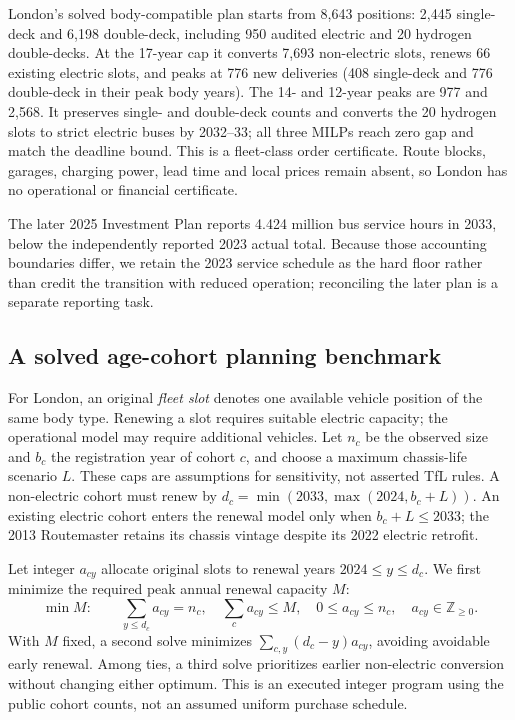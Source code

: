 \documentclass[12pt,letterpaper]{article}
\begin{document}


London's solved body-compatible plan starts from 8,643 positions: 2,445 single-deck and 6,198 double-deck, including 950 audited electric and 20 hydrogen double-decks. At the 17-year cap it converts 7,693 non-electric slots, renews 66 existing electric slots, and peaks at 776 new deliveries (408 single-deck and 776 double-deck in their peak body years). The 14- and 12-year peaks are 977 and 2,568. It preserves single- and double-deck counts and converts the 20 hydrogen slots to strict electric buses by 2032--33; all three MILPs reach zero gap and match the deadline bound. This is a fleet-class order certificate. Route blocks, garages, charging power, lead time and local prices remain absent, so London has no operational or financial certificate.\cite{tflaudit}

The later 2025 Investment Plan reports 4.424 million bus service hours in 2033, below the independently reported 2023 actual total. Because those accounting boundaries differ, we retain the 2023 service schedule as the hard floor rather than credit the transition with reduced operation; reconciling the later plan is a separate reporting task.\cite{investment2025,budget2025}

\subsection{A solved age-cohort planning benchmark}
For London, an original \emph{fleet slot} denotes one available vehicle position of the same body type. Renewing a slot requires suitable electric capacity; the operational model may require additional vehicles. Let $n_c$ be the observed size and $b_c$ the registration year of cohort $c$, and choose a maximum chassis-life scenario $L$. These caps are assumptions for sensitivity, not asserted TfL rules. A non-electric cohort must renew by $d_c=\min(2033,\max(2024,b_c+L))$. An existing electric cohort enters the renewal model only when $b_c+L\le2033$; the 2013 Routemaster retains its chassis vintage despite its 2022 electric retrofit.\cite{tflaudit}

Let integer $a_{cy}$ allocate original slots to renewal years $2024\le y\le d_c$. We first minimize the required peak annual renewal capacity $M$:
\begin{equation}
 \min M:\qquad \sum_{y\le d_c}a_{cy}=n_c,\quad
 \sum_c a_{cy}\le M,\quad 0\le a_{cy}\le n_c,\quad a_{cy}\in\mathbb Z_{\ge0}.
\end{equation}
With $M$ fixed, a second solve minimizes $\sum_{c,y}(d_c-y)a_{cy}$, avoiding avoidable early renewal. Among ties, a third solve prioritizes earlier non-electric conversion without changing either optimum. This is an executed integer program using the public cohort counts, not an assumed uniform purchase schedule.
\end{document}
